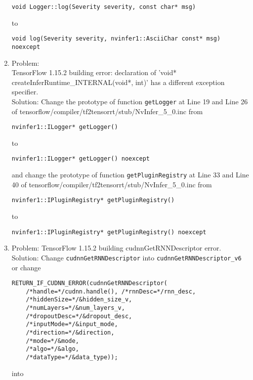 \documentclass[a4paper]{article}
\begin{document}
\begin{enumerate}
    \begin{verbatim}
void Logger::log(Severity severity, const char* msg)
    \end{verbatim}
    to
    \begin{verbatim}
void log(Severity severity, nvinfer1::AsciiChar const* msg) noexcept
    \end{verbatim}
    \item Problem:\\
    TensorFlow 1.15.2 building error: declaration of 'void* createInferRuntime\_INTERNAL(void*, int)' has a different exception specifier.\\
    Solution: Change the prototype of function \texttt{getLogger} at Line 19 and Line 26 of tensorflow/compiler/tf2tensorrt/stub/NvInfer\_5\_0.inc from
    \begin{verbatim}
nvinfer1::ILogger* getLogger()
    \end{verbatim}
    to
    \begin{verbatim}
nvinfer1::ILogger* getLogger() noexcept
    \end{verbatim}
    and change the prototype of function \texttt{getPluginRegistry} at Line 33 and Line 40 of tensorflow/compiler/tf2tensorrt/stub/NvInfer\_5\_0.inc from
    \begin{verbatim}
nvinfer1::IPluginRegistry* getPluginRegistry()
    \end{verbatim}
    to
    \begin{verbatim}
nvinfer1::IPluginRegistry* getPluginRegistry() noexcept
    \end{verbatim}
    \item Problem: TensorFlow 1.15.2 building cudnnGetRNNDescriptor error.\\
    Solution: Change \texttt{cudnnGetRNNDescriptor} into \texttt{cudnnGetRNNDescriptor\_v6} or change
    \begin{verbatim}
RETURN_IF_CUDNN_ERROR(cudnnGetRNNDescriptor(
    /*handle=*/cudnn.handle(), /*rnnDesc=*/rnn_desc,
    /*hiddenSize=*/&hidden_size_v,
    /*numLayers=*/&num_layers_v,
    /*dropoutDesc=*/&dropout_desc,
    /*inputMode=*/&input_mode,
    /*direction=*/&direction,
    /*mode=*/&mode,
    /*algo=*/&algo,
    /*dataType=*/&data_type));
    \end{verbatim}
    into

\end{enumerate}
\end{document}
